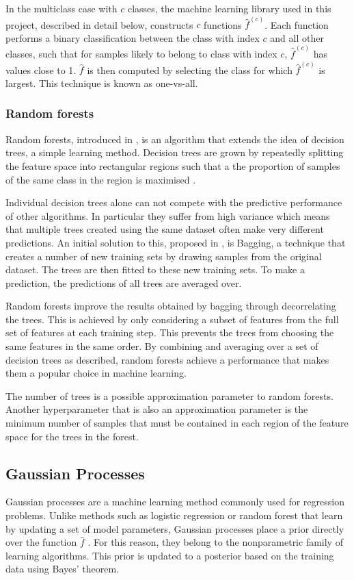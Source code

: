 \documentclass[a4paper,12pt,twoside,openright]{report}
\begin{document}
In the multiclass case with $c$ classes, the machine learning library used in this project, described in detail below, constructs $c$ functions $\hat{f}^{(c)}$. Each function performs a binary classification between the class with index $c$ and all other classes, such that for samples likely to belong to class with index $c$, $\hat{f}^{(c)}$ has values close to 1. $\hat{f}$ is then computed by selecting the class for which $\hat{f}^{(c)}$ is largest. This technique is known as one-vs-all.

\subsubsection{Random forests}
Random forests, introduced in \cite{rndforests}, is an algorithm that extends the idea of decision trees, a simple learning method. Decision trees are grown by repeatedly splitting the feature space into rectangular regions such that a the proportion of samples of the same class in the region is maximised \cite{james2014introduction}. 

Individual decision trees alone can not compete with the predictive performance of other algorithms. In particular they suffer from high variance which means that multiple trees created using the same dataset often make very different predictions. An initial solution to this, proposed in \cite{bagging}, is Bagging, a technique that creates a number of new training sets by drawing samples from the original dataset. The trees are then fitted to these new training sets. To make a prediction, the predictions of all trees are averaged over.

Random forests improve the results obtained by bagging through decorrelating the trees. This is achieved by only considering a subset of features from the full set of features at each training step. This prevents the trees from choosing the same features in the same order. By combining and averaging over a set of decision trees as described, random forests achieve a performance that makes them a popular choice in machine learning.

The number of trees is a possible approximation parameter to random forests. Another hyperparameter that is also an approximation parameter is the minimum number of samples that must be contained in each region of the feature space for the trees in the forest.

\subsection{Gaussian Processes}
Gaussian processes are a machine learning method commonly used for regression problems. Unlike methods such as logistic regression or random forest that learn by updating a set of model parameters, Gaussian processes place a prior directly over the function $\hat{f}$ \cite{Murphy:2012:MLP:2380985}. For this reason, they belong to the nonparametric family of learning algorithms. This prior is updated to a posterior based on the training data using Bayes' theorem.
\end{document}
